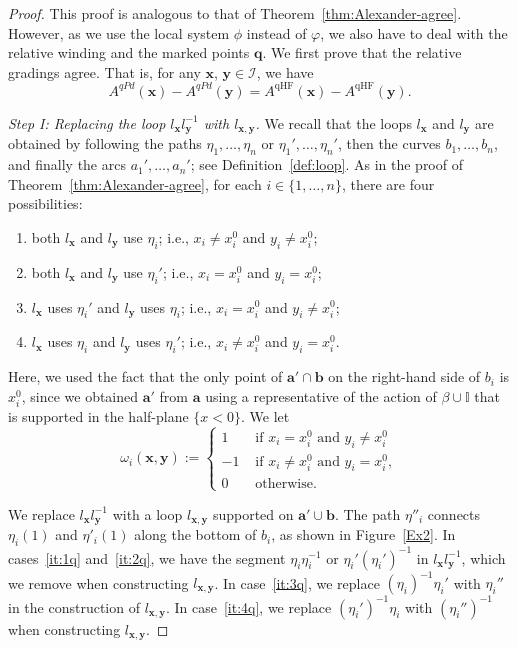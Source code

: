 \documentclass[11pt]{amsart}
\numberwithin{equation}{section}
\numberwithin{figure}{section}
\theoremstyle{definition}
\newcommand{\cI}{\mathcal{I}}
\newcommand{\bI}{\mathbb{I}}
\DeclareMathOperator{\qHF}{qHF}
\newcommand{\ba}{\boldsymbol{a}}
\newcommand{\bb}{\boldsymbol{b}}
\newcommand{\qs}{\boldsymbol{q}}
\newcommand{\xs}{\boldsymbol{x}}
\newcommand{\ys}{\boldsymbol{y}}
\begin{document}
\begin{proof}
This proof is analogous to that of Theorem~\ref{thm:Alexander-agree}. However, as we use the local system $\phi$ instead of $\varphi$, we also have to deal with the relative winding and the marked points $\qs$. We first prove that the relative gradings agree. That is, for any $\xs$, $\ys \in \cI$, we have
\begin{equation}\label{eqn:relative-quantum-agree}
A^{qPd}(\xs)-A^{qPd}(\ys) = A^{\qHF}(\xs) - A^{\qHF}(\ys).
\end{equation}
    
{\it Step I: Replacing the loop $l_{\xs} l_{\ys}^{-1}$ with $l_{\xs,\ys}$.}
We recall that the loops $l_{\xs}$ and $l_{\ys}$ are obtained by following the paths $\eta_1,\dots,\eta_n$ or $\eta_1',\dots,\eta_n'$, then the curves $b_1, \dots, b_n$, and finally the arcs $a_1',\dots,a_n'$; see Definition~\ref{def:loop}.
As in the proof of Theorem~\ref{thm:Alexander-agree}, for each $i \in \{1,\dots,n\}$, there are four possibilities:
\begin{enumerate}
    \item\label{it:1q} both $l_{\xs}$ and $l_{\ys}$ use $\eta_i$; i.e., $x_i \neq x_i^0$ and $y_i \neq x_i^0$;
    \item\label{it:2q} both $l_{\xs}$ and $l_{\ys}$ use $\eta_i'$; i.e., $x_i = x_i^0$ and $y_i = x_i^0$;
    \item\label{it:3q} $l_{\xs}$ uses $\eta_i'$ and $l_{\ys}$ uses $\eta_i$; i.e., $x_i = x_i^0$ and $y_i \neq x_i^0$;
    \item\label{it:4q} $l_{\xs}$ uses $\eta_i$ and $l_{\ys}$ uses $\eta_i'$; i.e., $x_i \neq x_i^0$ and $y_i = x_i^0$.
\end{enumerate}
Here, we used the fact that the only point of $\ba' \cap \bb$ on the right-hand side of $b_i$ is $x_i^0$, since we obtained $\ba'$ from $\ba$ using a representative of the action of $\beta \cup \bI$ that is supported in the half-plane $\{x<0\}$. We let
\[
\omega_i(\xs,\ys) :=
\begin{cases}
    1 &\text{ if } x_i = x_i^0 \text{ and } y_i \neq x^0_i \\
    -1 &\text{ if } x_i \neq x_i^0 \text{ and } y_i = x^0_i, \\
    0 &\text{ otherwise.}
\end{cases}
\]

We replace $l_{\xs} l_{\ys}^{-1}$ with a loop $l_{\xs,\ys}$ supported on $\ba' \cup \bb$. The path $\eta''_i$ connects $\eta_i(1)$ and $\eta'_i(1)$ along the bottom of $b_i$, as shown in Figure~\ref{Ex2}. In cases~\ref{it:1q} and~\ref{it:2q}, we have the segment $\eta_i \eta_i^{-1}$ or $\eta_i' (\eta_i')^{-1}$ in $l_{\xs} l_{\ys}^{-1}$, which we remove when constructing $l_{\xs,\ys}$. In case~\ref{it:3q}, we replace $(\eta_i)^{-1} \eta_i'$ with $\eta_i''$ in the construction of $l_{\xs,\ys}$. In case~\ref{it:4q}, we replace $(\eta_i')^{-1} \eta_i$ with $(\eta_i'')^{-1}$ when constructing $l_{\xs,\ys}$.


\end{proof}
\end{document}
